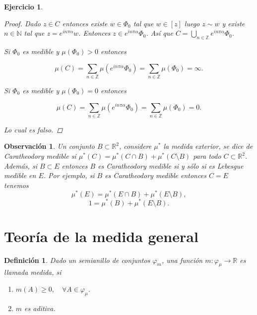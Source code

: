 \documentclass[twoside,12pt,a4 paper,openright]{book}
\newtheorem{ejer}[claim]{Ejercicio}
\newtheorem{defi}[claim]{Definici\'on}
\newtheorem{ob}[claim]{Observaci\'on}
\begin{document}
\begin{ejer}
\begin{enumerate}
\begin{proof}
Dado $z\in C$ entonces existe $w\in \Phi_0$ tal que $w \in [z]$ luego $z\sim w$ y existe $n\in \mathbb N $ tal que $z = e^{i n\pi \alpha} w $. Entonces $z \in  e^{i n\pi \alpha}  \Phi_0 $. As\'i que $C  =   \bigcup_{n\in\mathbb Z}  e^{i n\pi \alpha}  \Phi_0 $.
 
Si  $ \Phi_0 $ es medible  y $  \mu (  \Phi_0) > 0 $ entonces 

$$\mu (C) = \sum_{n\in \mathbb Z} \mu ( e^{i n\pi \alpha}  \Phi_0) =  \sum_{n\in \mathbb Z} \mu (  \Phi_0)  =\infty .$$


Si  $ \Phi_0 $ es medible  y $  \mu (  \Phi_0) = 0 $  entonces 

$$\mu (C) = \sum_{n\in \mathbb Z} \mu ( e^{i n\pi \alpha}  \Phi_0) =  \sum_{n\in \mathbb Z} \mu (  \Phi_0)  =0.$$

Lo cual es falso. 

\end{proof}


\end{enumerate}
\end{ejer}


 

\begin{ob} Un conjunto $B\subset \mathbb R^2$, considere  $\mu^*$ la medida exterior,  se dice de Caratheodory medible si $\mu^*(C) = \mu^*(C\cap B) + \mu^*(C\setminus B)$ para todo $C\subset \mathbb R^2$.
    Adem\'as, si $B \subset E$    entonces $B$ es Caratheodory medible si y s\'olo si es Lebesgue medible en $E$. Por ejemplo, si $B$ es Caratheodory medible entonces $C=E$ tenemos 
    $$\mu^*(E) = \mu^*(E\cap B) + \mu^*(E\setminus B),$$
    $$1 = \mu^*(B) + \mu^*(E\setminus B).$$
      
\end{ob}





\section{Teor\'ia de la medida general}

\begin{defi}
    Dado un semianillo de conjuntos $\varphi_ m $, una funci\'on $m:\varphi_\mu \to \mathbb{R}$ es llamada medida, si 
    \begin{enumerate}[label=\alph*)]
        \item   $m(A)\geq 0,\quad\forall A\in \varphi_\mu$.

        \item $m$ es aditiva.
    \end{enumerate}
\end{defi}
\end{document}
